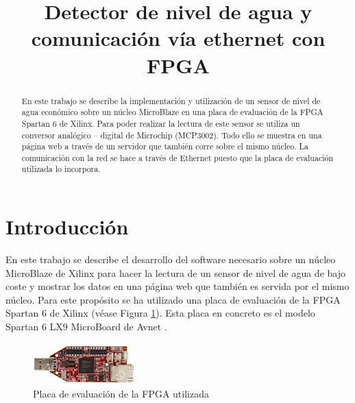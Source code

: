 \documentclass[conference,compsoc]{IEEEtran}
\begin{document}
	\title{Detector de nivel de agua y comunicaci\'on v\'ia ethernet con FPGA}

	\author{
	}

	\maketitle

	\begin{abstract}

		En este trabajo se describe la implementaci\'on y utilizaci\'on de un sensor de nivel de agua
		econ\'omico sobre un n\'ucleo MicroBlaze en una placa de evaluaci\'on de la FPGA Spartan 6 de
		Xilinx. Para poder realizar la lectura de este sensor se utiliza un conversor anal\'ogico --
		digital de Microchip (MCP3002). Todo ello se muestra en una p\'agina web a trav\'es de un
		servidor que tambi\'en corre sobre el mismo n\'ucleo. La comunicaci\'on con la red se hace a
		trav\'es de Ethernet puesto que la placa de evaluaci\'on utilizada lo incorpora.

	\end{abstract}

	\section{Introducci\'on}

		En este trabajo se describe el desarrollo del software necesario sobre
		un n\'ucleo MicroBlaze de Xilinx para hacer la lectura de un sensor de
		nivel de agua de bajo coste y mostrar los datos en una p\'agina web que
		tambi\'en es servida por el mismo n\'ucleo. Para este prop\'osito se ha
		utilizado una placa de evaluaci\'on de la FPGA Spartan 6 de Xilinx
		(v\'ease Figura \ref{fig:fpga}). Esta placa en concreto es el modelo
		Spartan 6 LX9 MicroBoard de Avnet \cite{bib:avnet}.

		\begin{figure}[h!]
			\centering
			\includegraphics[width=0.35\textwidth]{./figuras/fpga.jpg}
			\caption{Placa de evaluaci\'on de la FPGA utilizada}
			\label{fig:fpga}
		\end{figure}
\end{document}
